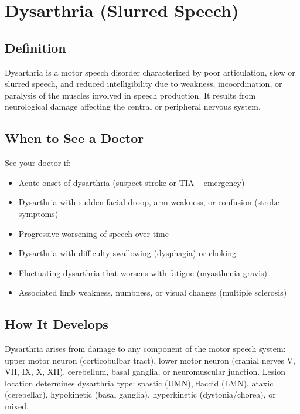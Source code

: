 \chapter{Dysarthria (Slurred Speech)}

\section*{Definition}
Dysarthria is a motor speech disorder characterized by poor articulation, slow or slurred speech, and reduced intelligibility due to weakness, incoordination, or paralysis of the muscles involved in speech production. It results from neurological damage affecting the central or peripheral nervous system.

\section*{When to See a Doctor}
See your doctor if:
\begin{itemize}
  \item Acute onset of dysarthria (suspect stroke or TIA -- emergency)
  \item Dysarthria with sudden facial droop, arm weakness, or confusion (stroke symptoms)
  \item Progressive worsening of speech over time
  \item Dysarthria with difficulty swallowing (dysphagia) or choking
  \item Fluctuating dysarthria that worsens with fatigue (myasthenia gravis)
  \item Associated limb weakness, numbness, or visual changes (multiple sclerosis)
\end{itemize}

\section*{How It Develops}
Dysarthria arises from damage to any component of the motor speech system: upper motor neuron (corticobulbar tract), lower motor neuron (cranial nerves V, VII, IX, X, XII), cerebellum, basal ganglia, or neuromuscular junction. Lesion location determines dysarthria type: spastic (UMN), flaccid (LMN), ataxic (cerebellar), hypokinetic (basal ganglia), hyperkinetic (dystonia/chorea), or mixed.

